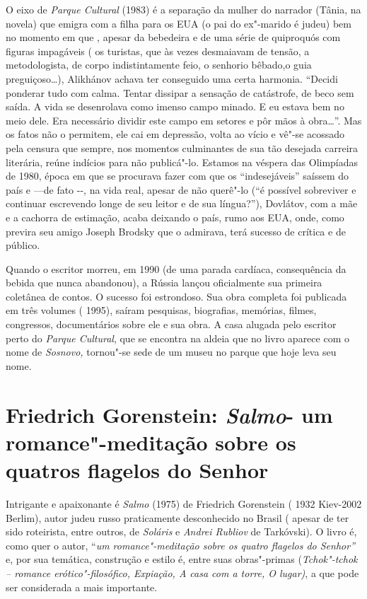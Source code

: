 O eixo de \emph{Parque Cultural} (1983) é a separação da mulher do
narrador (Tânia, na novela) que emigra com a filha para os EUA (o pai do
ex"-marido é judeu) bem no momento em que , apesar da bebedeira e de uma
série de quiproquós com figuras impagáveis ( os turistas, que às vezes
desmaiavam de tensão, a metodologista, de corpo indistintamente feio, o
senhorio bêbado,o guia preguiçoso\ldots{}), Alikhánov achava ter conseguido
uma certa harmonia. ``Decidi ponderar tudo com calma. Tentar dissipar a
sensação de catástrofe, de beco sem saída. A vida se desenrolava como
imenso campo minado. E eu estava bem no meio dele. Era necessário
dividir este campo em setores e pôr mãos à obra\ldots{}''. Mas os fatos não o
permitem, ele cai em depressão, volta ao vício e vê"-se acossado pela
censura que sempre, nos momentos culminantes de sua tão desejada
carreira literária, reúne indícios para não publicá"-lo. Estamos na
véspera das Olimpíadas de 1980, época em que se procurava fazer com que
os ``indesejáveis'' saíssem do país e ---de fato -\/-, na vida real,
apesar de não querê"-lo (``é possível sobreviver e continuar escrevendo
longe de seu leitor e de sua língua?''), Dovlátov, com a mãe e a
cachorra de estimação, acaba deixando o país, rumo aos EUA, onde, como
previra seu amigo Joseph Brodsky que o admirava, terá sucesso de crítica
e de público.

Quando o escritor morreu, em 1990 (de uma parada cardíaca, consequência
da bebida que nunca abandonou), a Rússia lançou oficialmente sua
primeira coletânea de contos. O sucesso foi estrondoso. Sua obra
completa foi publicada em três volumes ( 1995), saíram pesquisas,
biografias, memórias, filmes, congressos, documentários sobre ele e sua
obra. A casa alugada pelo escritor perto do \emph{Parque Cultural}, que
se encontra na aldeia que no livro aparece com o nome de \emph{Sosnovo,}
tornou"-se sede de um museu no parque que hoje leva seu nome.

\chapter{Friedrich Gorenstein: \emph{Salmo}- um romance"-meditação sobre os quatros flagelos do Senhor}

Intrigante e apaixonante é \emph{Salmo} (1975) de Friedrich Gorenstein (
1932 Kiev-2002 Berlim), autor judeu russo praticamente desconhecido no
Brasil ( apesar de ter sido roteirista, entre outros, de \emph{Soláris}
e \emph{Andrei Rubliov} de Tarkóvski). O livro é, como quer o autor,
``\emph{um romance"-meditação sobre os quatro flagelos do Senhor''} e,
por sua temática, construção e estilo é, entre suas obras"-primas
(\emph{Tchok"-tchok -- romance erótico"-filosófico, Expiação, A casa com a
torre, O lugar)}, a que pode ser considerada a mais importante.

